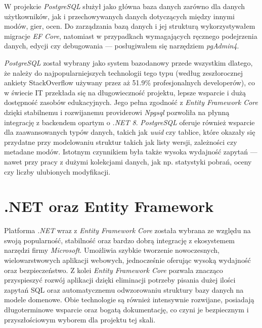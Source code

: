 \documentclass[a4paper,twoside,12pt]{book}
\begin{document}
W projekcie \textit{PostgreSQL} służył jako główna baza danych zarówno dla danych użytkowników, jak i przechowywanych danych dotyczących między innymi modów, gier, ocen. Do zarządzania bazą danych i jej strukturą wykorzystywałem migracje \textit{EF Core}, natomiast w przypadkach wymagających ręcznego podejrzenia danych, edycji czy debugowania — posługiwałem się narzędziem \textit{pgAdmin4}.

\textit{PostgreSQL} został wybrany jako system bazodanowy przede wszystkim dlatego, że należy do najpopularniejszych technologii tego typu (według zeszłorocznej ankiety StackOverflow \cite{stackoverflow2024survey} używany przez aż 51.9\% profesjonalnych developerów), co w świecie IT przekłada się na długowieczność projektu, lepsze wsparcie i dużą dostępność zasobów edukacyjnych. Jego pełna zgodność z \textit{Entity Framework Core} dzięki stabilnemu i rozwijanemu providerowi \textit{Npgsql} \cite{npgsql2025} pozwoliła na płynną integrację z backendem opartym o \textit{.NET 8}. \textit{PostgreSQL} oferuje również wsparcie dla zaawansowanych typów danych, takich jak \textit{uuid} czy tablice, które okazały się przydatne przy modelowaniu struktur takich jak listy wersji, zależności czy metadane modów. Istotnym czynnikiem była także wysoka wydajność zapytań — nawet przy pracy z dużymi kolekcjami danych, jak np. statystyki pobrań, oceny czy liczby ulubionych modyfikacji.

\section{.NET oraz Entity Framework}

Platforma \textit{.NET} wraz z \textit{Entity Framework Core} została wybrana ze względu na swoją popularność, stabilność oraz bardzo dobrą integrację z ekosystemem narzędzi firmy \textit{Microsoft}. Umożliwia szybkie tworzenie nowoczesnych, wielowarstwowych aplikacji webowych, jednocześnie oferując wysoką wydajność oraz bezpieczeństwo. Z kolei \textit{Entity Framework Core} pozwala znacząco przyspieszyć rozwój aplikacji dzięki eliminacji potrzeby pisania dużej ilości zapytań SQL oraz automatycznemu odwzorowaniu struktury bazy danych na modele domenowe. Obie technologie są również intensywnie rozwijane, posiadają długoterminowe wsparcie oraz bogatą dokumentację, co czyni je bezpiecznym i przyszłościowym wyborem dla projektu tej skali.
\end{document}
